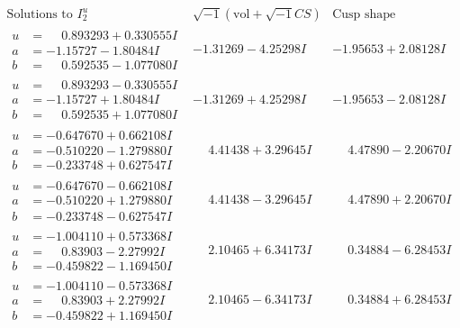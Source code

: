 \documentclass[1p]{elsarticle_modified}
\theoremstyle{definition}
\newcommand{\I}{\sqrt{-1}}
\begin{document}
$$\begin{array}{c|c|c}  
\text{Solutions to }I^u_{2}& \I (\text{vol} + \sqrt{-1}CS) & \text{Cusp shape}\\
 \hline 
\begin{aligned}
u &= \phantom{-}0.893293 + 0.330555 I \\
a &= -1.15727 - 1.80484 I \\
b &= \phantom{-}0.592535 - 1.077080 I\end{aligned}
 & -1.31269 - 4.25298 I & -1.95653 + 2.08128 I \\ \hline\begin{aligned}
u &= \phantom{-}0.893293 - 0.330555 I \\
a &= -1.15727 + 1.80484 I \\
b &= \phantom{-}0.592535 + 1.077080 I\end{aligned}
 & -1.31269 + 4.25298 I & -1.95653 - 2.08128 I \\ \hline\begin{aligned}
u &= -0.647670 + 0.662108 I \\
a &= -0.510220 - 1.279880 I \\
b &= -0.233748 + 0.627547 I\end{aligned}
 & \phantom{-}4.41438 + 3.29645 I & \phantom{-}4.47890 - 2.20670 I \\ \hline\begin{aligned}
u &= -0.647670 - 0.662108 I \\
a &= -0.510220 + 1.279880 I \\
b &= -0.233748 - 0.627547 I\end{aligned}
 & \phantom{-}4.41438 - 3.29645 I & \phantom{-}4.47890 + 2.20670 I \\ \hline\begin{aligned}
u &= -1.004110 + 0.573368 I \\
a &= \phantom{-}0.83903 - 2.27992 I \\
b &= -0.459822 - 1.169450 I\end{aligned}
 & \phantom{-}2.10465 + 6.34173 I & \phantom{-}0.34884 - 6.28453 I \\ \hline\begin{aligned}
u &= -1.004110 - 0.573368 I \\
a &= \phantom{-}0.83903 + 2.27992 I \\
b &= -0.459822 + 1.169450 I\end{aligned}
 & \phantom{-}2.10465 - 6.34173 I & \phantom{-}0.34884 + 6.28453 I \\ \hline\begin{aligned}

\end{aligned}
\end{array}$$
\end{document}

